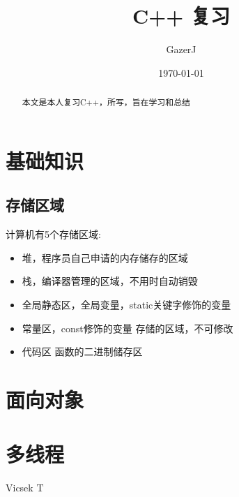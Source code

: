 \documentclass{article}
\begin{document}
\begin{CJK}{UTF8}{gkai}

\title{C++ 复习 }
\author{ GazerJ}
\date{\today}
\maketitle
\begin{abstract}
	本文是本人复习C++，所写，旨在学习和总结
\end{abstract}

\section{基础知识}
	\subsection{存储区域}
		计算机有5个存储区域:
	\begin{itemize}
	\item 堆，程序员自己申请的内存储存的区域
	\item 栈，编译器管理的区域，不用时自动销毁
	\item 全局静态区，全局变量，static关键字修饰的变量
	\item 常量区，const修饰的变量 存储的区域，不可修改
	\item 代码区 函数的二进制储存区
	\end{itemize}
\section{面向对象}

\section{多线程}


\begin{thebibliography}{12345}%
 Vicsek T


\end{thebibliography}
\end{CJK}
\end{document}

